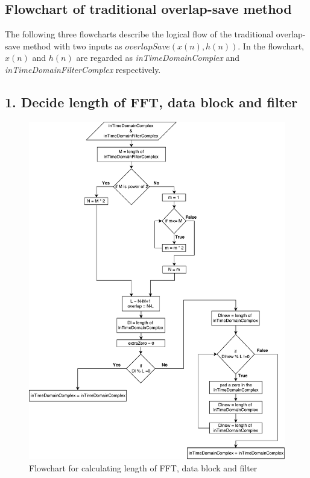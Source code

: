 \begin{refsection}
\subsection*{Flowchart of traditional overlap-save method}
The following three flowcharts describe the logical flow of the traditional overlap-save method with two inputs as $overlapSave(x(n), h(n))$. In the flowchart, $x(n)$ and $h(n)$ are regarded as \textit{inTimeDomainComplex} and  \textit{inTimeDomainFilterComplex} respectively.
\subsection*{1. Decide length of FFT, data block and filter}
\begin{figure}[h]
	\centering
	\includegraphics[width=13cm]{./algorithms/overlap_save/figures/overlapSave.pdf}
	\caption{Flowchart for calculating length of FFT, data block and filter}
	\label{overlapSave_length}
\end{figure}


\end{refsection}

